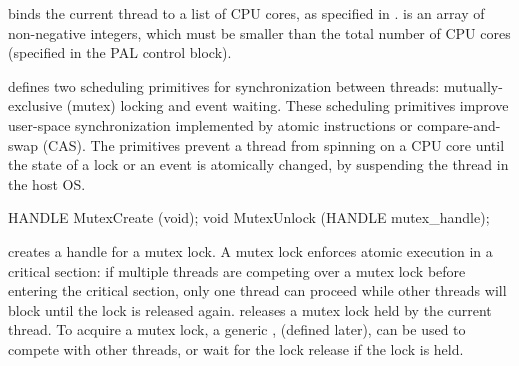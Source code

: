  binds the current thread to a list of CPU cores, as specified in .
 is an array of non-negative integers, which must be smaller than the total number of CPU cores (specified in the PAL control block).





\Thehostabi{} defines two scheduling primitives for synchronization between threads: mutually-exclusive (mutex) locking and event waiting.
These scheduling primitives improve user-space synchronization
implemented by atomic instructions or compare-and-swap (CAS).
The primitives prevent a thread from spinning on a CPU core
until the state of a lock or an event
is atomically changed,
by suspending the thread in the host OS.








\begin{paldef}
HANDLE MutexCreate (void);
void   MutexUnlock (HANDLE mutex_handle);
\end{paldef}


 creates a handle for a mutex lock.
A mutex lock enforces atomic execution in a critical section:
if multiple threads are competing over a mutex lock
before entering the critical section,
only one thread can proceed while other threads will block until the lock is released again.
 releases a mutex lock held
by the current thread.
To acquire a mutex lock,
a generic \hostapi{},
 (defined later),
can be used to compete with other threads,
or wait for the lock release if the lock is held.



